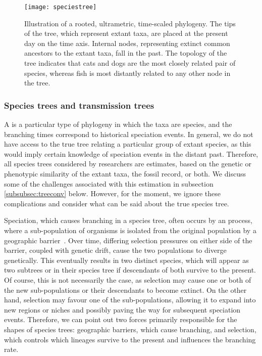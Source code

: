 \begin{figure}[ht]
  \centering
  \label{fig:speciestree}
  \texttt{[image: speciestree]}
  \caption[Illustration of a rooted, ultrametric, time-scaled phylogeny]
    {Illustration of a rooted, ultrametric, time-scaled phylogeny. The tips of
      the tree, which represent extant taxa, are placed at the present day on
      the time axis. Internal nodes, representing extinct common ancestors to
      the extant taxa, fall in the past. The topology of the tree indicates
      that cats and dogs are the most closely related pair of species, whereas
      fish is most distantly related to any other node in the tree.}
\end{figure}

\subsubsection{Species trees and transmission trees}
\label{subsubsec:speciestree}

A  is a particular type of phylogeny in which the taxa are
species, and the branching times correspond to historical speciation events. In
general, we do not have access to the true tree relating a particular group of
extant species, as this would imply certain knowledge of speciation events in
the distant past. Therefore, all species trees considered by researchers are
estimates, based on the genetic or phenotypic similarity of the extant taxa,
the fossil record, or both. We discuss some of the challenges associated with
this estimation in subsection \ref{subsubsec:treeconv} below. However, for the
moment, we ignore these complications and consider what can be said about the
true species tree.

Speciation, which causes branching in a species tree, often occurs by an
 process, where a sub-population of organisms is isolated from
the original population by a geographic barrier~\autocite{coyne2004speciation}.
Over time, differing selection pressures on either side of the barrier, coupled
with genetic drift, cause the two populations to diverge genetically. This
eventually results in two distinct species, which will appear as two subtrees
or  in their species tree if descendants of both survive to the
present. Of course, this is not necessarily the case, as selection may cause
one or both of the new sub-populations or their descendants to become extinct.
On the other hand, selection may favour one of the sub-populations, allowing it
to expand into new regions or niches and possibly paving the way for subsequent
speciation events. Therefore,  we can point
out two forces primarily responsible for the shapes of species trees:
geographic barriers, which cause branching, and selection, which controls which
lineages survive to the present and influences the branching rate.


